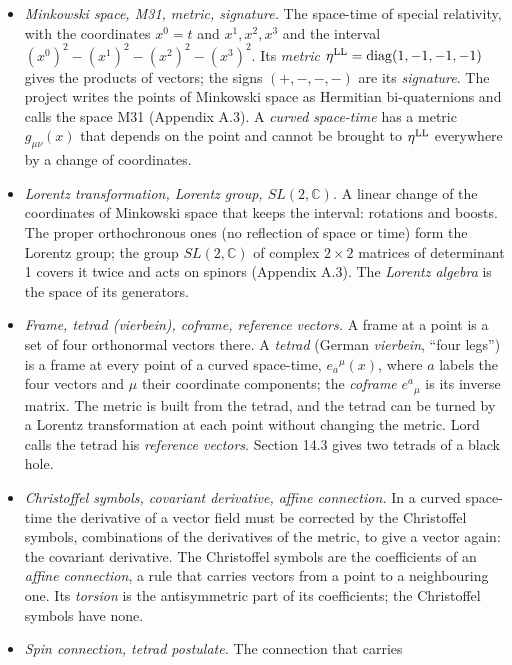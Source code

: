 \documentclass[
  10pt,
]{article}
\providecommand{\tightlist}{%
  \setlength{\itemsep}{0pt}\setlength{\parskip}{0pt}}
\begin{document}
\begin{itemize}
\tightlist
\item
  \emph{Minkowski space, M31, metric, signature.} The space-time of
  special relativity, with the coordinates \(x^0=t\) and \(x^1,x^2,x^3\)
  and the interval \((x^0)^2-(x^1)^2-(x^2)^2-(x^3)^2\). Its
  \emph{metric} \(\eta^{\rm LL}=\mathrm{diag}(1,-1,-1,-1)\) gives the
  products of vectors; the signs \((+,-,-,-)\) are its \emph{signature}.
  The project writes the points of Minkowski space as Hermitian
  bi-quaternions and calls the space M31 (Appendix A.3). A \emph{curved
  space-time} has a metric \(g_{\mu\nu}(x)\) that depends on the point
  and cannot be brought to \(\eta^{\rm LL}\) everywhere by a change of
  coordinates.
\item
  \emph{Lorentz transformation, Lorentz group, \(SL(2,\mathbb C)\).} A
  linear change of the coordinates of Minkowski space that keeps the
  interval: rotations and boosts. The proper orthochronous ones (no
  reflection of space or time) form the Lorentz group; the group
  \(SL(2,\mathbb C)\) of complex \(2\times2\) matrices of determinant 1
  covers it twice and acts on spinors (Appendix A.3). The \emph{Lorentz
  algebra} is the space of its generators.
\item
  \emph{Frame, tetrad (vierbein), coframe, reference vectors.} A frame
  at a point is a set of four orthonormal vectors there. A \emph{tetrad}
  (German \emph{vierbein}, ``four legs'') is a frame at every point of a
  curved space-time, \(e_a{}^\mu(x)\), where \(a\) labels the four
  vectors and \(\mu\) their coordinate components; the \emph{coframe}
  \(e^a{}_\mu\) is its inverse matrix. The metric is built from the
  tetrad, and the tetrad can be turned by a Lorentz transformation at
  each point without changing the metric. Lord calls the tetrad his
  \emph{reference vectors}. Section 14.3 gives two tetrads of a black
  hole.
\item
  \emph{Christoffel symbols, covariant derivative, affine connection.}
  In a curved space-time the derivative of a vector field must be
  corrected by the Christoffel symbols, combinations of the derivatives
  of the metric, to give a vector again: the covariant derivative. The
  Christoffel symbols are the coefficients of an \emph{affine
  connection}, a rule that carries vectors from a point to a
  neighbouring one. Its \emph{torsion} is the antisymmetric part of its
  coefficients; the Christoffel symbols have none.
\item
  \emph{Spin connection, tetrad postulate.} The connection that carries

\end{itemize}
\end{document}

